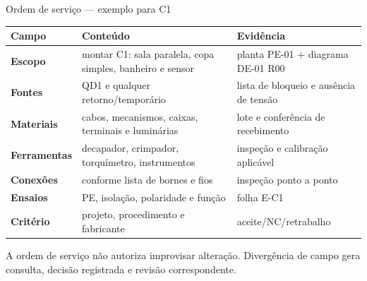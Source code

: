 \begin{frame}{Ordem de serviço — exemplo para C1}
\scriptsize
\begin{tabularx}{\textwidth}{>{\bfseries}p{2.4cm}X X}
\toprule
Campo & Conteúdo & Evidência \\
\midrule
Escopo & montar C1: sala paralela, copa simples, banheiro e sensor & planta PE-01 + diagrama DE-01 R00 \\
Fontes & QD1 e qualquer retorno/temporário & lista de bloqueio e ausência de tensão \\
Materiais & cabos, mecanismos, caixas, terminais e luminárias & lote e conferência de recebimento \\
Ferramentas & decapador, crimpador, torquímetro, instrumentos & inspeção e calibração aplicável \\
Conexões & conforme lista de bornes e fios & inspeção ponto a ponto \\
Ensaios & PE, isolação, polaridade e função & folha E-C1 \\
Critério & projeto, procedimento e fabricante & aceite/NC/retrabalho \\
\bottomrule
\end{tabularx}
\begin{caixaAt}
A ordem de serviço não autoriza improvisar alteração. Divergência de campo gera consulta, decisão registrada e revisão correspondente.
\end{caixaAt}
\end{frame}

